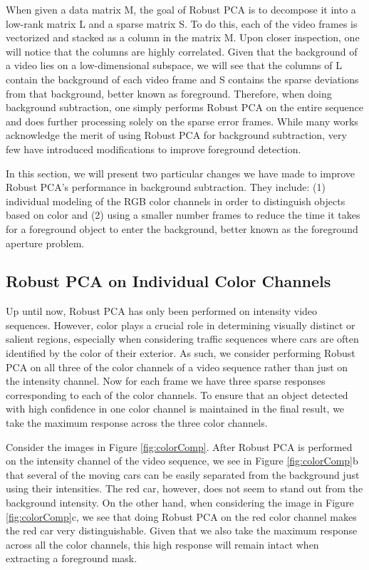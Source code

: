 \documentclass{article}
\begin{document}
When given a data matrix M, the goal of Robust PCA is to decompose it into a low-rank matrix L and a sparse matrix S. To do this, each of the video frames is vectorized and stacked as a column in the matrix M. Upon closer inspection, one will notice that the columns are highly correlated. %
Given that the background of a video lies on a low-dimensional subspace, we will see that the columns of L contain the background of each video frame and S contains the sparse deviations from that background, better known as foreground. Therefore, when doing background subtraction, one simply performs Robust PCA on the entire sequence and does further processing solely on the sparse error frames. While many works acknowledge the merit of using Robust PCA for background subtraction, very few have introduced modifications to improve foreground detection. 

In this section, we will present two particular changes we have made to improve Robust PCA's performance in background subtraction. They include: (1) individual modeling of the RGB color channels in order to distinguish objects based on color and (2) using a smaller number frames to reduce the time it takes for a foreground object to enter the background, better known as the foreground aperture problem.


\subsection{Robust PCA on Individual Color Channels}

Up until now, Robust PCA has only been performed on intensity video sequences. However, color plays a crucial role in determining visually distinct or salient regions, especially when considering traffic sequences where cars are often identified by the color of their exterior. As such, we consider performing Robust PCA on all three of the color channels of a video sequence rather than just on the intensity channel. Now for each frame we have three sparse responses corresponding to each of the color channels. To ensure that an object detected with high confidence in one color channel is maintained in the final result, we take the maximum response across the three color channels.

Consider the images in Figure \ref{fig:colorComp}. After Robust PCA is performed on the intensity channel of the video sequence, we see in Figure \ref{fig:colorComp}b that several of the moving cars can be easily separated from the background just using their intensities. The red car, however, does not seem to stand out  from the background intensity. On the other hand, when considering the image in Figure \ref{fig:colorComp}c, we see that doing Robust PCA on the red color channel makes the red car very distinguishable. Given that we also take the maximum response across all the color channels, this high response will remain intact when extracting a foreground mask.
\end{document}
